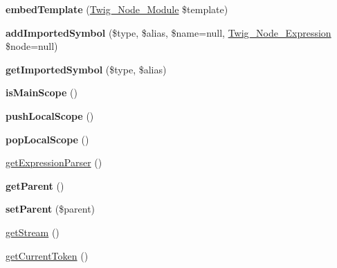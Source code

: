 \begin{DoxyCompactItemize}
\item 
{\bfseries embed\+Template} (\hyperlink{classTwig__Node__Module}{Twig\+\_\+\+Node\+\_\+\+Module} \$template)\hypertarget{classTwig__Parser_a8aa7a1694813905e23f33e8c7c886ee1}{}\label{classTwig__Parser_a8aa7a1694813905e23f33e8c7c886ee1}

\item 
{\bfseries add\+Imported\+Symbol} (\$type, \$alias, \$name=null, \hyperlink{classTwig__Node__Expression}{Twig\+\_\+\+Node\+\_\+\+Expression} \$node=null)\hypertarget{classTwig__Parser_a1912cd37fc3476ec9129802edcbf2d14}{}\label{classTwig__Parser_a1912cd37fc3476ec9129802edcbf2d14}

\item 
{\bfseries get\+Imported\+Symbol} (\$type, \$alias)\hypertarget{classTwig__Parser_ab1bfa551bb165643a5288f0967e77898}{}\label{classTwig__Parser_ab1bfa551bb165643a5288f0967e77898}

\item 
{\bfseries is\+Main\+Scope} ()\hypertarget{classTwig__Parser_aaaf312778b9e73011dc9be670479ce7c}{}\label{classTwig__Parser_aaaf312778b9e73011dc9be670479ce7c}

\item 
{\bfseries push\+Local\+Scope} ()\hypertarget{classTwig__Parser_ad269aed5836f6deb997855b602867f38}{}\label{classTwig__Parser_ad269aed5836f6deb997855b602867f38}

\item 
{\bfseries pop\+Local\+Scope} ()\hypertarget{classTwig__Parser_a21c9c3287c77439e78a5b545af65618a}{}\label{classTwig__Parser_a21c9c3287c77439e78a5b545af65618a}

\item 
\hyperlink{classTwig__Parser_a7b9265b1c79e27dd143dc5789b395649}{get\+Expression\+Parser} ()
\item 
{\bfseries get\+Parent} ()\hypertarget{classTwig__Parser_a6509438ffdef5c85127adeba433b78d5}{}\label{classTwig__Parser_a6509438ffdef5c85127adeba433b78d5}

\item 
{\bfseries set\+Parent} (\$parent)\hypertarget{classTwig__Parser_a4cff9c70d03d6541802f17ee525efe97}{}\label{classTwig__Parser_a4cff9c70d03d6541802f17ee525efe97}

\item 
\hyperlink{classTwig__Parser_ab079e94546cf4e59fd0e0f86b31f350a}{get\+Stream} ()
\item 
\hyperlink{classTwig__Parser_a48da8799eb900cdfe5a3a0ce9b759d7b}{get\+Current\+Token} ()
\end{DoxyCompactItemize}
